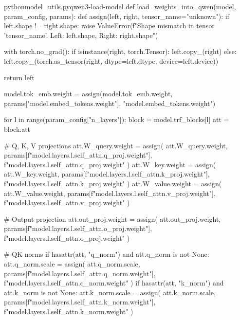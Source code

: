 \documentclass[lang=cn,newtx,10pt,scheme=chinese]{elegantbook}
\begin{document}
\begin{codebox}{python}{model\_utils.py}{qwen3-load-model}
def load_weights_into_qwen(model, param_config, params):
    def assign(left, right, tensor_name="unknown"):
        if left.shape != right.shape:
            raise ValueError(f"Shape mismatch in tensor '{tensor_name}'. Left: {left.shape}, Right: {right.shape}")
        
        with torch.no_grad():
            if isinstance(right, torch.Tensor):
                left.copy_(right)
            else:
                left.copy_(torch.as_tensor(right, dtype=left.dtype, device=left.device))
    
        return left 

    model.tok_emb.weight = assign(model.tok_emb.weight, params["model.embed_tokens.weight"], "model.embed_tokens.weight")

    for l in range(param_config["n_layers"]):
        block = model.trf_blocks[l]
        att = block.att

        # Q, K, V projections
        att.W_query.weight = assign(
            att.W_query.weight,
            params[f"model.layers.{l}.self_attn.q_proj.weight"],
            f"model.layers.{l}.self_attn.q_proj.weight"
        )
        att.W_key.weight = assign(
            att.W_key.weight,
            params[f"model.layers.{l}.self_attn.k_proj.weight"],
            f"model.layers.{l}.self_attn.k_proj.weight"
        )
        att.W_value.weight = assign(
            att.W_value.weight,
            params[f"model.layers.{l}.self_attn.v_proj.weight"],
            f"model.layers.{l}.self_attn.v_proj.weight"
        )

        # Output projection
        att.out_proj.weight = assign(
            att.out_proj.weight,
            params[f"model.layers.{l}.self_attn.o_proj.weight"],
            f"model.layers.{l}.self_attn.o_proj.weight"
        )

        # QK norms
        if hasattr(att, "q_norm") and att.q_norm is not None:
            att.q_norm.scale = assign(
                att.q_norm.scale,
                params[f"model.layers.{l}.self_attn.q_norm.weight"],
                f"model.layers.{l}.self_attn.q_norm.weight"
            )
        if hasattr(att, "k_norm") and att.k_norm is not None:
            att.k_norm.scale = assign(
                att.k_norm.scale,
                params[f"model.layers.{l}.self_attn.k_norm.weight"],
                f"model.layers.{l}.self_attn.k_norm.weight"
            )


\end{codebox}
\end{document}
